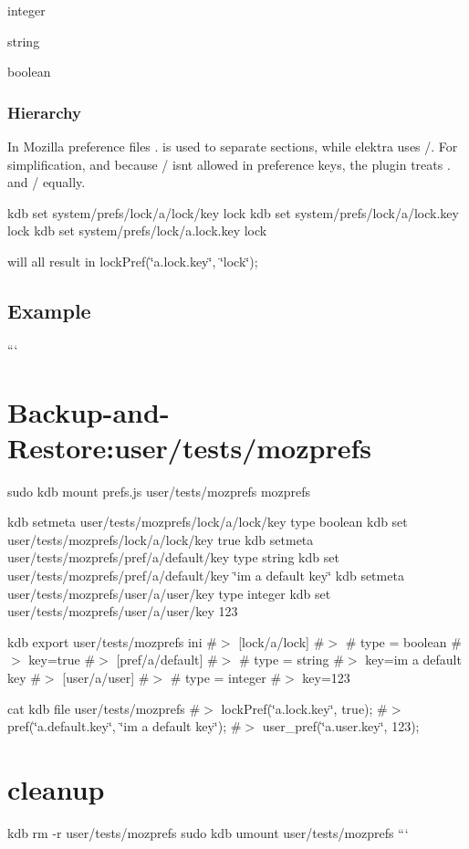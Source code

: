 \begin{DoxyItemize}
\item {\ttfamily integer}
\item {\ttfamily string}
\item {\ttfamily boolean}
\end{DoxyItemize}

\subsubsection*{Hierarchy}

In Mozilla preference files {\ttfamily .} is used to separate sections, while elektra uses {\ttfamily /}. For simplification, and because {\ttfamily /} isn\textquotesingle{}t allowed in preference keys, the plugin treats {\ttfamily .} and {\ttfamily /} equally.


\begin{DoxyCode}
kdb set system/prefs/lock/a/lock/key lock
kdb set system/prefs/lock/a/lock.key lock
kdb set system/prefs/lock/a.lock.key lock
\end{DoxyCode}


will all result in {\ttfamily lock\+Pref(\char`\"{}a.\+lock.\+key\char`\"{}, \char`\"{}lock\char`\"{});}

\subsection*{Example}

``` \section*{Backup-\/and-\/\+Restore\+:user/tests/mozprefs}

sudo kdb mount prefs.\+js user/tests/mozprefs mozprefs

kdb setmeta user/tests/mozprefs/lock/a/lock/key type boolean kdb set user/tests/mozprefs/lock/a/lock/key true kdb setmeta user/tests/mozprefs/pref/a/default/key type string kdb set user/tests/mozprefs/pref/a/default/key \char`\"{}i\textquotesingle{}m a default key\char`\"{} kdb setmeta user/tests/mozprefs/user/a/user/key type integer kdb set user/tests/mozprefs/user/a/user/key 123

kdb export user/tests/mozprefs ini \#$>$ \mbox{[}lock/a/lock\mbox{]} \#$>$ \# type = boolean \#$>$ key=true \#$>$ \mbox{[}pref/a/default\mbox{]} \#$>$ \# type = string \#$>$ key=i\textquotesingle{}m a default key \#$>$ \mbox{[}user/a/user\mbox{]} \#$>$ \# type = integer \#$>$ key=123

cat {\ttfamily kdb file user/tests/mozprefs} \#$>$ lock\+Pref(\char`\"{}a.\+lock.\+key\char`\"{}, true); \#$>$ pref(\char`\"{}a.\+default.\+key\char`\"{}, \char`\"{}i\textquotesingle{}m a default key\char`\"{}); \#$>$ user\+\_\+pref(\char`\"{}a.\+user.\+key\char`\"{}, 123);

\section*{cleanup}

kdb rm -\/r user/tests/mozprefs sudo kdb umount user/tests/mozprefs ``` 